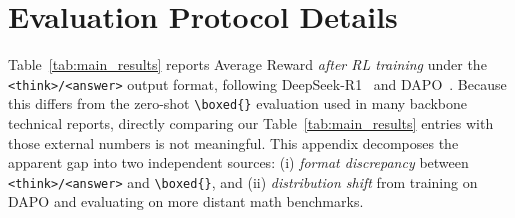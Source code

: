 \documentclass[11pt]{article}
\theoremstyle{definition}
\theoremstyle{remark}
\begin{document}



\section{Evaluation Protocol Details}
\label{sec:eval_protocol}

Table~\ref{tab:main_results} reports Average Reward \emph{after RL training} under the \texttt{<think>/<answer>} output format, following DeepSeek-R1~\cite{guo2025deepseek} and DAPO~\cite{yu2025dapo}. Because this differs from the zero-shot \texttt{\textbackslash boxed\{\}} evaluation used in many backbone technical reports, directly comparing our Table~\ref{tab:main_results} entries with those external numbers is not meaningful. This appendix decomposes the apparent gap into two independent sources: (i) \emph{format discrepancy} between \texttt{<think>/<answer>} and \texttt{\textbackslash boxed\{\}}, and (ii) \emph{distribution shift} from training on DAPO and evaluating on more distant math benchmarks.
\end{document}
